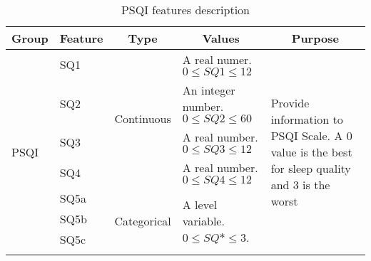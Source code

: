 \documentclass[10pt,letterpaper,oneside]{article}
\begin{document}
\begin{table}[ht]
	\centering
	\caption{PSQI features description}
	\label{tab:psqi-features-description}
	\begin{tabular}{|l|l|l|p{3cm}|p{5cm}|}
		\hline
		\multicolumn{1}{|c|}{\textbf{Group}} & \multicolumn{1}{c|}{\textbf{Feature}} & \multicolumn{1}{c|}{\textbf{Type}} & \multicolumn{1}{c|}{\textbf{Values}}                    & \multicolumn{1}{c|}{\textbf{Purpose}}                                                                              \\ \hline
		\multirow{18}{*}{PSQI}               & SQ1                                   & \multirow{4}{*}{Continuous}        & A real numer.   $ 0 \leq  SQ1 \leq 12 $                    & \multirow{18}{5cm}{Provide information to PSQI Scale. A 0 value is the best for sleep quality and 3 is the worst} \\ \cline{2-2} \cline{4-4}
		& SQ2                                   &                                    & An integer number. $ 0 \leq SQ2 \leq 60 $               &                                                                                                                 \\ \cline{2-2} \cline{4-4}
		& SQ3                                   &                                    & A real number. $ 0 \leq SQ3 \leq 12 $                      &                                                                                                                 \\ \cline{2-2} \cline{4-4}
		& SQ4                                   &                                    & A real number. $ 0 \leq SQ4 \leq 12 $                      &                                                                                                                 \\ \cline{2-4}
		& SQ5a                                  & \multirow{14}{*}{Categorical}      & \multirow{14}{3cm}{A level variable. $ 0 \leq SQ* \leq 3 $.} &                                                                                                                 \\ \cline{2-2}
		& SQ5b                                  &                                    &                                                         &                                                                                                                 \\ \cline{2-2}
		& SQ5c                                  &                                    &                                                         &                                                                                                                 \\ \cline{2-2}

\end{tabular}
\end{table}
\end{document}
